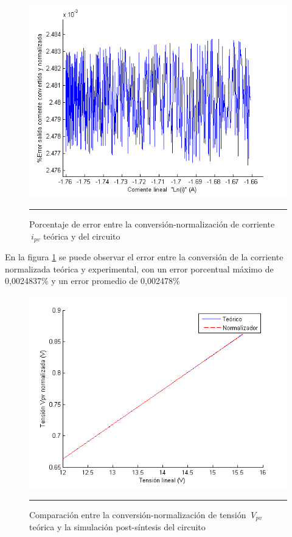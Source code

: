   \begin{figure}[H]
  \centering
    \includegraphics[scale=0.7]{./ERROR_CONV_NORM_I.png}
    \rule{35em}{0.5pt}
  \caption[Porcentaje de Error entre la conversión-normalización de corriente $\ i_{pv}$ teórica y del circuito]{Porcentaje de error entre la conversión-normalización de corriente $\ i_{pv}$ teórica y del circuito}
  \label{fig:ENORMI}
\end{figure}

En la figura \ref{fig:ENORMI} se puede observar el error entre la conversión de la corriente normalizada teórica y experimental, con un error porcentual máximo de 0,0024837\% y un error promedio de 0,002478\% 


  \begin{figure}[H]
  \centering
    \includegraphics[scale=0.7]{./Normalizador_V.png}
    \rule{35em}{0.5pt}
  \caption[Comparación entre la conversión-normalización de tensión $\ V_{pv}$ teórica y la simulación post-síntesis del circuito]{Comparación entre la conversión-normalización de tensión  $\ V_{pv}$ teórica y la simulación post-síntesis del circuito}
  \label{fig:NORMV}
\end{figure}


